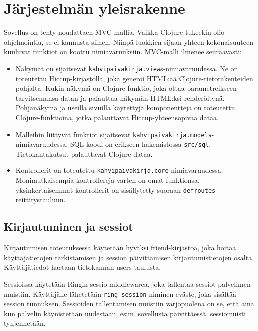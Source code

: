 \documentclass[a4paper,titlepage]{article}
\begin{document}
\section{Järjestelmän yleisrakenne}

Sovellus on tehty noudattaen MVC-mallia.
Vaikka Clojure tukeekin olio-ohjelmointia, se ei kannusta siihen.
Niinpä luokkien sijaan yhteen kokonaisuuteen kuuluvat funktiot on koottu nimiavaruuksiin.
MVC-malli ilmenee seuraavasti:

\begin{itemize}
    \item Näkymät on sijaitsevat
      \texttt{kahvipaivakirja.view}s-nimiavaruudessa. Ne on toteutettu
      Hiccup-kirjastolla, joka generoi HTML:ää
      Clojure-tietorakenteiden pohjalta. Kukin näkymä on
      Clojure-funktio, joka ottaa parametreikseen tarvitsemansa datan
      ja palauttaa näkymän HTML:ksi renderöitynä. Pohjanäkymä ja
      useilla sivuilla käytettyjä komponentteja on toteutettu
      Clojure-funktioina, jotka palauttavat Hiccup-yhteensopivaa
      dataa.

    \item Malleihin liittyvät funktiot sijaitsevat
      \texttt{kahvipaivakirja.models}-nimiavaruudessa. SQL-koodi on
      erikseen hakemistossa \texttt{src/sql}. Tietokantakutsut
      palauttavat Clojure-dataa.

    \item Kontrollerit on toteutettu
      \texttt{kahvipaivakirja.core}-nimiavaruudessa. Monimutkaisempia
      kontrollereja varten on omat funktionsa, yksinkertaisemmat
      kontrollerit on sisällytetty suoraan
      \texttt{defroutes}-reittitystauluun.
\end{itemize}


\subsection{Kirjautuminen ja sessiot}

Kirjautumisen toteutuksessa käytetään hyväksi
\href{https://github.com/cemerick/friend}{friend-kirjastoa}, joka
hoitaa käyttäjätietojen tarkistamisen ja session päivittämisen
kirjautumistietojen osalta. Käyttäjätiedot haetaan tietokannan
users-taulusta.

Sessioissa käytetään Ringin sessio-middlewarea, joka tallentaa sessiot
palvelimen muistiin. Käyttäjälle lähetetään
\texttt{ring-session}-niminen eväste, joka sisältää session
tunnuksen. Sessioiden tallentamisen muistiin varjopuolena on se, että
aina kun palvelin käynistetään uudestaan, esim. sovellusta
päivittäessä, sessiomuisti tyhjennetään.
\end{document}

